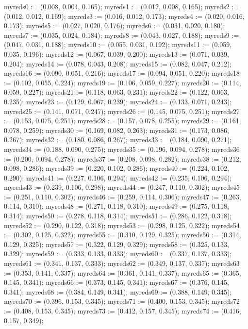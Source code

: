 myreds0 := (0.008, 0.004, 0.165);
myreds1 := (0.012, 0.008, 0.165);
myreds2 := (0.012, 0.012, 0.169);
myreds3 := (0.016, 0.012, 0.173);
myreds4 := (0.020, 0.016, 0.173);
myreds5 := (0.027, 0.020, 0.176);
myreds6 := (0.031, 0.020, 0.180);
myreds7 := (0.035, 0.024, 0.184);
myreds8 := (0.043, 0.027, 0.188);
myreds9 := (0.047, 0.031, 0.188);
myreds10 := (0.055, 0.031, 0.192);
myreds11 := (0.059, 0.035, 0.196);
myreds12 := (0.067, 0.039, 0.200);
myreds13 := (0.071, 0.039, 0.204);
myreds14 := (0.078, 0.043, 0.208);
myreds15 := (0.082, 0.047, 0.212);
myreds16 := (0.090, 0.051, 0.216);
myreds17 := (0.094, 0.051, 0.220);
myreds18 := (0.102, 0.055, 0.224);
myreds19 := (0.106, 0.059, 0.227);
myreds20 := (0.114, 0.059, 0.227);
myreds21 := (0.118, 0.063, 0.231);
myreds22 := (0.122, 0.063, 0.235);
myreds23 := (0.129, 0.067, 0.239);
myreds24 := (0.133, 0.071, 0.243);
myreds25 := (0.141, 0.071, 0.247);
myreds26 := (0.145, 0.075, 0.251);
myreds27 := (0.153, 0.075, 0.251);
myreds28 := (0.157, 0.078, 0.255);
myreds29 := (0.161, 0.078, 0.259);
myreds30 := (0.169, 0.082, 0.263);
myreds31 := (0.173, 0.086, 0.267);
myreds32 := (0.180, 0.086, 0.267);
myreds33 := (0.184, 0.090, 0.271);
myreds34 := (0.188, 0.090, 0.275);
myreds35 := (0.196, 0.094, 0.278);
myreds36 := (0.200, 0.094, 0.278);
myreds37 := (0.208, 0.098, 0.282);
myreds38 := (0.212, 0.098, 0.286);
myreds39 := (0.220, 0.102, 0.286);
myreds40 := (0.224, 0.102, 0.290);
myreds41 := (0.227, 0.106, 0.294);
myreds42 := (0.235, 0.106, 0.294);
myreds43 := (0.239, 0.106, 0.298);
myreds44 := (0.247, 0.110, 0.302);
myreds45 := (0.251, 0.110, 0.302);
myreds46 := (0.259, 0.114, 0.306);
myreds47 := (0.263, 0.114, 0.310);
myreds48 := (0.271, 0.118, 0.310);
myreds49 := (0.275, 0.118, 0.314);
myreds50 := (0.278, 0.118, 0.314);
myreds51 := (0.286, 0.122, 0.318);
myreds52 := (0.290, 0.122, 0.318);
myreds53 := (0.298, 0.125, 0.322);
myreds54 := (0.302, 0.125, 0.322);
myreds55 := (0.310, 0.129, 0.325);
myreds56 := (0.314, 0.129, 0.325);
myreds57 := (0.322, 0.129, 0.329);
myreds58 := (0.325, 0.133, 0.329);
myreds59 := (0.333, 0.133, 0.333);
myreds60 := (0.337, 0.137, 0.333);
myreds61 := (0.341, 0.137, 0.333);
myreds62 := (0.349, 0.137, 0.337);
myreds63 := (0.353, 0.141, 0.337);
myreds64 := (0.361, 0.141, 0.337);
myreds65 := (0.365, 0.145, 0.341);
myreds66 := (0.373, 0.145, 0.341);
myreds67 := (0.376, 0.145, 0.341);
myreds68 := (0.384, 0.149, 0.341);
myreds69 := (0.388, 0.149, 0.345);
myreds70 := (0.396, 0.153, 0.345);
myreds71 := (0.400, 0.153, 0.345);
myreds72 := (0.408, 0.153, 0.345);
myreds73 := (0.412, 0.157, 0.345);
myreds74 := (0.416, 0.157, 0.349);
